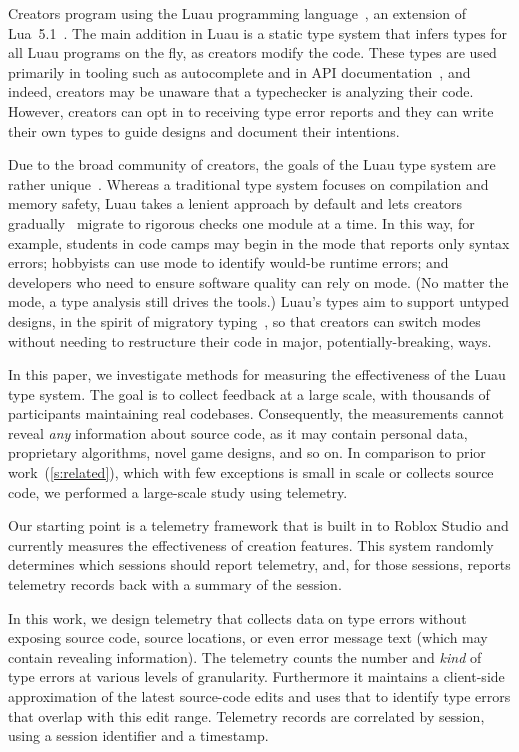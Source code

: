 \documentclass[english,submission,cleveref]{programming}
\begin{document}
Creators program using the
{Luau} programming language~\cite{luau-lang.org},
an extension of {Lua~5.1~\cite{lua}}.
The main addition in Luau is a static type system that infers
types for all Luau programs on the fly, as creators modify the code.
These types are used primarily in \IDE{} tooling such as autocomplete and
in API documentation~\cite{luau-autocomplete}, and indeed, creators
may be unaware that a typechecker is analyzing their code.
However, creators can opt in to receiving type error reports and they can write
their own types to guide designs and document their intentions.

Due to the broad community of creators, the goals of the Luau type
system are rather unique~\cite{bfj-hatra-2021}.
Whereas a traditional type system focuses on compilation and memory
safety, Luau takes a lenient approach by default and lets creators
gradually~\cite{st-sfp-2006,tf-popl-2008} migrate to rigorous checks
one module at a time.
In this way, for example,
students in code camps may begin in the \mnocheck{} mode that reports only
syntax errors; hobbyists can use \mnonstrict{} mode to identify
would-be runtime errors; and developers who need to ensure software
quality can rely on \mstrict{} mode.
(No matter the mode, a {\FS{}} type analysis still drives the \IDE{} tools.)
Luau's types aim to support untyped designs, in the spirit of migratory
typing~\cite{tfffgksst-snapl-2017}, so that creators can switch modes without
needing to restructure their code in major, potentially-breaking, ways.

In this paper, we investigate methods for measuring the effectiveness
of the {Luau} type system.
The goal is to collect feedback at a large scale, with thousands
of participants maintaining real codebases.
Consequently, the measurements cannot reveal \emph{any} information about
source code, as it may contain personal data, proprietary algorithms, novel
game designs, and so on.
In comparison to prior work~(\cref{s:related}), which
with few exceptions is small in scale
or collects source code, we performed a large-scale study using \panon{}
{telemetry}.

Our starting point is a telemetry framework that is built in
to {Roblox Studio} and currently measures the effectiveness of
creation features.
This system randomly determines which sessions should report telemetry, and,
for those sessions, reports telemetry records back with a summary of the
session.

In this work, we design telemetry that collects data on type errors without
exposing source code, source locations, or even error message text (which
may contain revealing information).
The telemetry counts the number and \emph{kind} of type errors at various
levels of granularity.
Furthermore it maintains a client-side approximation of the latest source-code
edits and uses that to identify type errors that overlap with this edit range.
Telemetry records are correlated by session, using a \panon{} session
identifier and a timestamp.
\end{document}
